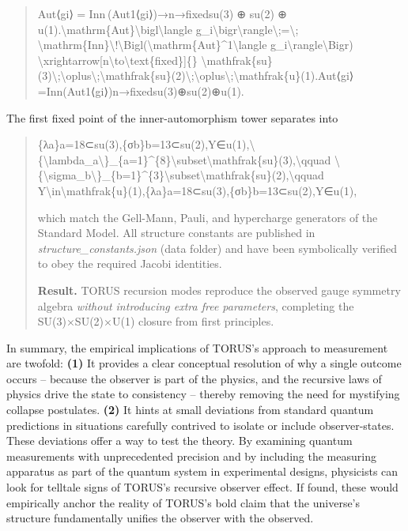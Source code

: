 \documentclass[
]{article}
\begin{document}
{\begin{quote}
Aut⟨gi⟩  =  Inn ⁣(Aut1⟨gi⟩)→n→fixedsu(3)  ⊕  su(2)  ⊕  u(1).\textbackslash mathrm\{Aut\}\textbackslash bigl\textbackslash langle
g\_i\textbackslash bigr\textbackslash rangle\textbackslash;=\textbackslash;
\textbackslash mathrm\{Inn\}\textbackslash!\textbackslash Bigl(\textbackslash mathrm\{Aut\}\^{}1\textbackslash langle
g\_i\textbackslash rangle\textbackslash Bigr)
\textbackslash xrightarrow{[}n\textbackslash to\textbackslash text\{fixed\}{]}\{\}
\textbackslash mathfrak\{su\}(3)\textbackslash;\textbackslash oplus\textbackslash;\textbackslash mathfrak\{su\}(2)\textbackslash;\textbackslash oplus\textbackslash;\textbackslash mathfrak\{u\}(1).Aut⟨gi\hspace{0pt}⟩=Inn(Aut1⟨gi\hspace{0pt}⟩)n→fixed\hspace{0pt}su(3)⊕su(2)⊕u(1).
\end{quote}

The first fixed point of the inner-automorphism tower separates into

\begin{quote}
\{λa\}a=18⊂su(3),\{σb\}b=13⊂su(2),Y∈u(1),\textbackslash\{\textbackslash lambda\_a\textbackslash\}\_\{a=1\}\^{}\{8\}\textbackslash subset\textbackslash mathfrak\{su\}(3),\textbackslash qquad
\textbackslash\{\textbackslash sigma\_b\textbackslash\}\_\{b=1\}\^{}\{3\}\textbackslash subset\textbackslash mathfrak\{su\}(2),\textbackslash qquad
Y\textbackslash in\textbackslash mathfrak\{u\}(1),\{λa\hspace{0pt}\}a=18\hspace{0pt}⊂su(3),\{σb\hspace{0pt}\}b=13\hspace{0pt}⊂su(2),Y∈u(1),

which match the Gell-Mann, Pauli, and hypercharge generators of the
Standard Model. All structure constants are published in
\emph{structure\_constants.json} (data folder) and have been
symbolically verified to obey the required Jacobi identities.

\textbf{Result.} TORUS recursion modes reproduce the observed gauge
symmetry algebra \emph{without introducing extra free parameters},
completing the SU(3)×SU(2)×U(1) closure from first principles.
\end{quote}

In summary, the empirical implications of TORUS's approach to
measurement are twofold: \textbf{(1)} It provides a clear conceptual
resolution of why a single outcome occurs -- because the observer is
part of the physics, and the recursive laws of physics drive the state
to consistency -- thereby removing the need for mystifying collapse
postulates. \textbf{(2)} It hints at small deviations from standard
quantum predictions in situations carefully contrived to isolate or
include observer-states. These deviations offer a way to test the
theory. By examining quantum measurements with unprecedented precision
and by including the measuring apparatus as part of the quantum system
in experimental designs, physicists can look for telltale signs of
TORUS's recursive observer effect. If found, these would empirically
anchor the reality of TORUS's bold claim that the universe's structure
fundamentally unifies the observer with the observed.

}
\end{document}
